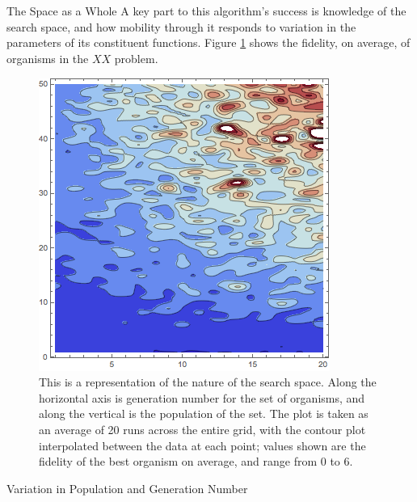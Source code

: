 \documentclass[12pt]{beamer}
\renewcommand{\maketitle}{%
	\begin{center}%
		\Huge\inserttitle\\[5mm]%
		\Large\insertauthor\\[5mm]%
		\Large\insertinstitute%
	\end{center}%
	\vspace*{-1.5ex}%
}
\begin{document}
\begin{frame}{\maketitle}
\begin{columns}
\begin{column}{.45\textwidth}
\begin{block}{The Space as a Whole}
  A key part to this algorithm's success is knowledge of the search space, and how mobility through it responds to variation in the parameters of its constituent functions. Figure \ref{fig:tot_plot} shows the fidelity, on average, of organisms in the $XX$ problem.

	\begin{figure}[htpb]
		\centering
			\includegraphics[scale=1]{genPlot_50O_20G.png}
		\centering
		\caption{This is a representation of the nature of the search space. Along the horizontal axis is generation number for the set of organisms, and along the vertical is the population of the set. The plot is taken as an average of 20 runs across the entire grid, with the contour plot interpolated between the data at each point; values shown are the fidelity of the best organism on average, and range from 0 to 6.}
		\label{fig:tot_plot}
	\end{figure}
\end{block}

\begin{exampleblock}{Variation in Population and Generation Number}


\end{exampleblock}
\end{column}
\end{columns}
\end{frame}
\end{document}
